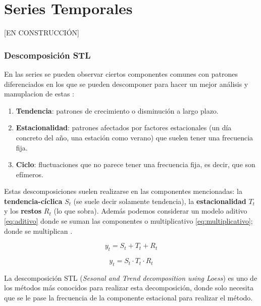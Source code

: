 %

\chapter{Series Temporales}\label{ch:st}

[EN CONSTRUCCIÓN]

\subsection{Descomposición STL}

En las series se pueden observar ciertos componentes comunes con patrones diferenciados en los que se pueden descomponer para hacer un mejor análisis y manuplacion de estas \cite{hyndman2018forecasting}:

\begin{enumerate}
  \item \textbf{Tendencia}: patrones de crecimiento o disminución a largo plazo.
  \item \textbf{Estacionalidad}: patrones afectados por factores estacionales (un día concreto del año, una estación como verano) que suelen tener una frecuencia fija.
  \item \textbf{Ciclo}: fluctuaciones que no parece tener una frecuencia fija, es decir, que son efímeros.
\end{enumerate}

Estas descomposiciones suelen realizarse en las componentes mencionadas: la \textbf{tendencia-cíclica} $S_t$ (se suele decir solamente tendencia), la \textbf{estacionalidad} $T_t$ y los \textbf{restos} $R_t$ (lo que sobra). Además podemos considerar un modelo aditivo \eqref{eq:aditivo} donde se suman las componentes o multiplicativo \eqref{eq:multiplicativo}; donde se multiplican \cite{hyndman2018forecasting}.

\begin{equation}
  y_t = S_t + T_t + R_t
  \label{eq:aditivo}
\end{equation}

\begin{equation}
  y_t = S_t \cdot T_t \cdot R_t
  \label{eq:multiplicativo}
\end{equation}

La descomposición STL (\emph{Sesonal and Trend decomposition using Loess}) \cite{cleveland1990stl} es uno de los métodos más conocidos para realizar esta decomposición, donde solo necesita que se le pase la frecuencia de la componente estacional para realizar el método.

\endinput
